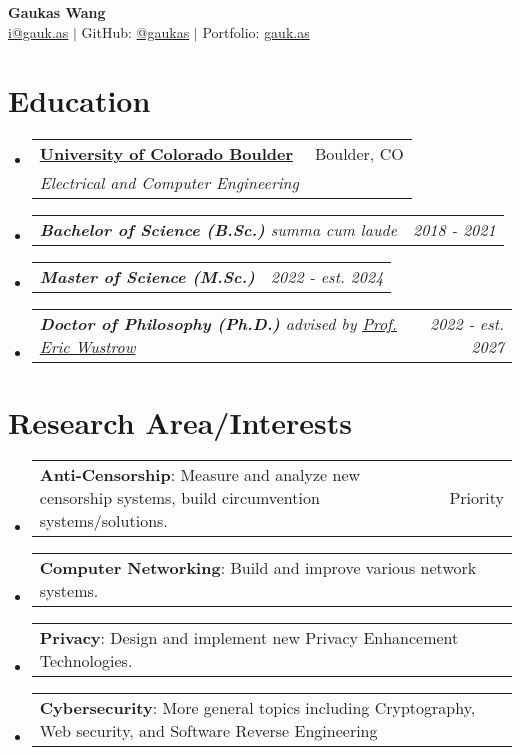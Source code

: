 \documentclass[letterpaper,11pt]{article}
\makeatletter
\newcommand{\resumeSubheading}[4]{
  \vspace{-2pt}\item
    \begin{tabular*}{0.97\textwidth}[t]{l@{\extracolsep{\fill}}r}
      \textbf{#1} & #2 \\
      \textit{\small#3} & \textit{\small #4} \\
    \end{tabular*}\vspace{-7pt}
}
\newcommand{\resumeSubSubheading}[2]{
    \item
    \begin{tabular*}{0.97\textwidth}{l@{\extracolsep{\fill}}r}
      \textit{\small#1} & \textit{\small #2} \\
    \end{tabular*}\vspace{-7pt}
}
\newcommand{\resumeProjectHeading}[2]{
    \item
    \begin{tabular*}{0.97\textwidth}{l@{\extracolsep{\fill}}r}
      \small#1 & #2 \\
    \end{tabular*}\vspace{-7pt}
}
\newcommand{\resumeSubHeadingListStart}{\begin{itemize}[leftmargin=0.15in, label={}]}
\newcommand{\resumeSubHeadingListEnd}{\end{itemize}}
\makeatother
\begin{document}
\begin{center}
  {\textbf{\Huge Gaukas Wang}} \\ \vspace{4pt}
    \href{mailto: i@gauk.as}{{i@gauk.as}} $|$ 
    GitHub: \href{https://github.com/gaukas}{@gaukas} $|$ 
    Portfolio: \href{https://gauk.as}{gauk.as}
\end{center}


\section{Education}
\resumeSubHeadingListStart
\resumeSubheading
{\href{https://colorado.edu}{University of Colorado Boulder}}{Boulder, CO}
{Electrical and Computer Engineering}{}
\resumeSubSubheading
{
  \em{\textbf{Bachelor of Science (B.Sc.)}} \textit{summa cum laude}
}{2018 - 2021}
\resumeSubSubheading
{
  \em{}\textbf{Master of Science (M.Sc.)} %
}{2022 - est. 2024}
\resumeSubSubheading
{
  \em{}\textbf{Doctor of Philosophy (Ph.D.)} 
  {advised by \href{https://ericw.us/trow}{Prof. Eric Wustrow}}
}{2022 - est. 2027}
\resumeSubHeadingListEnd

\vspace{1pt}

\section{Research Area/Interests}
\resumeSubHeadingListStart
  \resumeProjectHeading {\textbf{Anti-Censorship}: Measure and analyze new censorship systems, build circumvention systems/solutions.}{Priority}
  \resumeProjectHeading {\textbf{Computer Networking}: Build and improve various network systems.}{}
  \resumeProjectHeading {\textbf{Privacy}: Design and implement new Privacy Enhancement Technologies.}{}
  \resumeProjectHeading {\textbf{Cybersecurity}: More general topics including Cryptography, Web security, and Software Reverse Engineering}{}
\resumeSubHeadingListEnd
\vspace{1pt}

\end{document}

